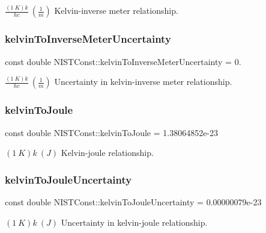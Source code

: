 $\frac{(1\ K)k}{hc} \ (\frac{1}{m})$ Kelvin-\/inverse meter relationship. \mbox{\label{group___n_i_s_t_const-_kelvin_ga8867224cfd317842c338873d002a4f94}} 
\subsubsection{\texorpdfstring{kelvin\+To\+Inverse\+Meter\+Uncertainty}{kelvinToInverseMeterUncertainty}}
{\footnotesize\ttfamily const double N\+I\+S\+T\+Const\+::kelvin\+To\+Inverse\+Meter\+Uncertainty = 0.}

$\frac{(1\ K)k}{hc} \ (\frac{1}{m})$ Uncertainty in kelvin-\/inverse meter relationship. \mbox{\label{group___n_i_s_t_const-_kelvin_gae77577280e3dd4a78d41af37076c8f8d}} 
\subsubsection{\texorpdfstring{kelvin\+To\+Joule}{kelvinToJoule}}
{\footnotesize\ttfamily const double N\+I\+S\+T\+Const\+::kelvin\+To\+Joule = 1.\+38064852e-\/23}

$(1\ K)k \ (J)$ Kelvin-\/joule relationship. \mbox{\label{group___n_i_s_t_const-_kelvin_ga53c28e7735a083676a91272677dd1e89}} 
\subsubsection{\texorpdfstring{kelvin\+To\+Joule\+Uncertainty}{kelvinToJouleUncertainty}}
{\footnotesize\ttfamily const double N\+I\+S\+T\+Const\+::kelvin\+To\+Joule\+Uncertainty = 0.\+00000079e-\/23}

$(1\ K)k \ (J)$ Uncertainty in kelvin-\/joule relationship. \mbox{\label{group___n_i_s_t_const-_kelvin_gaf5fcf341c9c92f8ede2f402989ae8de1}} 
